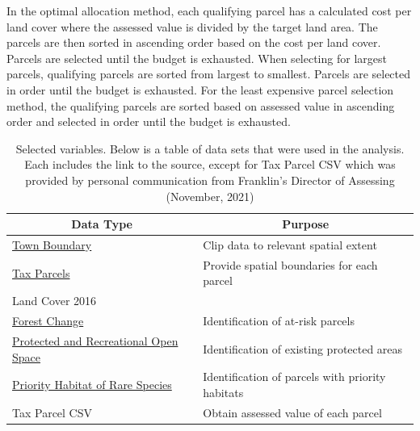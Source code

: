 \documentclass[12pt, stu, floatsintext,table]{apa7}
\begin{document}
In the optimal allocation method, each qualifying parcel has a calculated cost per land cover where the assessed value is divided by the target land area. The parcels are then sorted in ascending order based on the cost per land cover. Parcels are selected until the budget is exhausted. When selecting for largest parcels, qualifying parcels are sorted from largest to smallest. Parcels are selected in order until the budget is exhausted. For the least expensive parcel selection method, the qualifying parcels are sorted based on assessed value in ascending order and selected in order until the budget is exhausted. 
\begin{table}[htbp]
\centering
\caption{Selected variables. Below is a table of data sets that were used in the analysis. Each includes the link to the source, except for Tax Parcel CSV which was provided by personal communication from Franklin's Director of Assessing (November, 2021)}
\begin{tabular}{@{}ll@{}}
\toprule
\multicolumn{1}{c}{Data Type} & \multicolumn{1}{c}{Purpose}             \\ \midrule
\href{https://www.mass.gov/info-details/massgis-data-municipalities}{Town Boundary}                                               & Clip data to relevant spatial extent              \\
\href{https://www.mass.gov/info-details/massgis-data-property-tax-parcels}{Tax Parcels}                                           & Provide spatial boundaries for each parcel        \\
Land Cover 2016               \\
\href{https://glad.earthengine.app/view/global-forest-change#dl=1;old=off;bl=off;lon=20;lat=10;zoom=3;}{Forest Change}            & Identification of at-risk parcels                 \\
\href{https://www.mass.gov/info-details/massgis-data-protected-and-recreational-openspace}{Protected and Recreational Open Space} & Identification of existing protected areas        \\
\href{https://www.mass.gov/info-details/massgis-data-nhesp-priority-habitats-of-rare-species}{Priority Habitat of Rare Species}   & Identification of parcels with priority habitats  \\
Tax Parcel CSV                                                                                                                    & Obtain assessed value of each parcel              \\ \bottomrule
\end{tabular}
\end{table}
\end{document}
